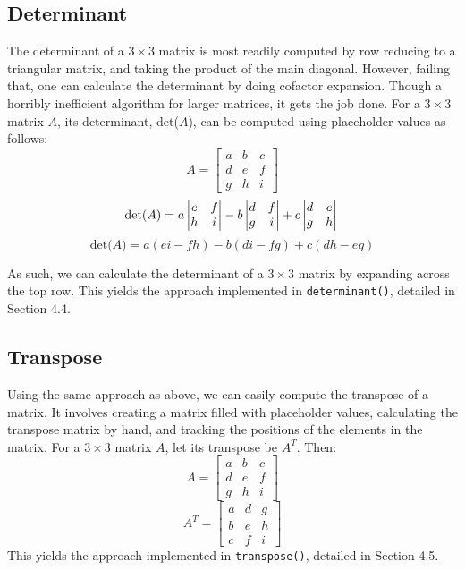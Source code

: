 \documentclass[12pt]{article}
\begin{document}
\subsection{Determinant}
The determinant of a $3\times3$ matrix is most readily computed by row reducing to a triangular matrix, and taking the product of the main diagonal. However, failing that, one can calculate the determinant by doing cofactor expansion. Though a horribly inefficient algorithm for larger matrices, it gets the job done. For a $3\times3$ matrix $A$, its determinant, det($A$), can be computed using placeholder values as follows:
\[
A =
\begin{bmatrix}
    a & b & c \\
    d & e & f \\
    g & h & i
\end{bmatrix}
\]
\begin{equation*}
\text{det($A$)} =
  a\begin{vmatrix}
  e & f\\
  h & i
  \end{vmatrix}  
  -b\begin{vmatrix}
  d & f\\
  g & i
  \end{vmatrix}  
  +c\begin{vmatrix}
  d & e\\
  g & h
  \end{vmatrix}\\\\
\end{equation*}
\begin{equation}
\text{det($A$)} =
a(ei-fh)-b(di-fg)+c(dh-eg)
\end{equation}

As such, we can calculate the determinant of a $3\times3$ matrix by expanding across the top row. This yields the approach implemented in \texttt{determinant()}, detailed in Section 4.4.

\subsection{Transpose}
Using the same approach as above, we can easily compute the transpose of a matrix. It involves creating a matrix filled with placeholder values, calculating the transpose matrix by hand, and tracking the positions of the elements in the matrix. For a $3\times3$ matrix $A$, let its transpose be $A^T$. Then:
\[
A =
\begin{bmatrix}
    a & b & c \\
    d & e & f \\
    g & h & i
\end{bmatrix}
\]
\begin{equation}
A^T =
    \begin{bmatrix}
    a & d & g \\
    b & e & h \\
    c & f & i
\end{bmatrix}
\end{equation}
This yields the approach implemented in \texttt{transpose()}, detailed in Section 4.5.
\end{document}
